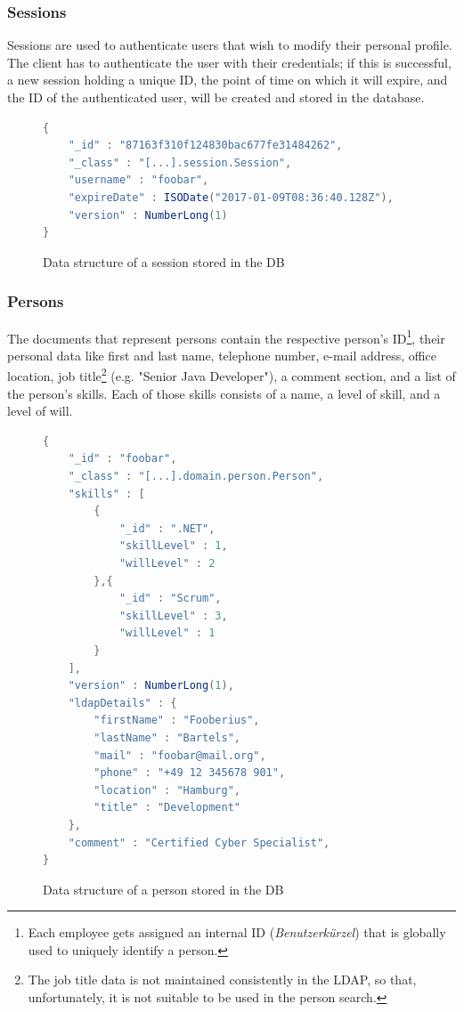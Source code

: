 \subsubsection{Sessions}
Sessions are used to authenticate users that wish to modify their personal profile. The client has to authenticate the user with their credentials; if this is successful, a new session holding a unique ID, the point of time on which it will expire, and the ID of the authenticated user, will be created and stored in the database.

\begin{figure}[h]
\begin{lstlisting}[language=Java]
{
	"_id" : "87163f310f124830bac677fe31484262",
	"_class" : "[...].session.Session",
	"username" : "foobar",
	"expireDate" : ISODate("2017-01-09T08:36:40.128Z"),
	"version" : NumberLong(1)
}
\end{lstlisting}
\caption[Data Structure: Session]{Data structure of a session stored in the DB}
\end{figure}
\subsubsection{Persons}
\label{db:person}
The documents that represent persons contain the respective person's ID\footnote{Each employee gets assigned an internal ID (\textit{Benutzerkürzel}) that is globally used to uniquely identify a person.}, their personal data like first and last name, telephone number, e-mail address, office location, job title\footnote{The job title data is not maintained consistently in the LDAP, so that, unfortunately, it is not suitable to be used in the person search.} (e.g. "Senior Java Developer"), a comment section, and a list of the person's skills. Each of those skills consists of a name, a level of skill, and a level of will.
\begin{figure}[h]
\begin{lstlisting}[language=Java]
{
	"_id" : "foobar",
	"_class" : "[...].domain.person.Person",
	"skills" : [
		{
			"_id" : ".NET",
			"skillLevel" : 1,
			"willLevel" : 2
		},{
			"_id" : "Scrum",
			"skillLevel" : 3,
			"willLevel" : 1
		}
	],
	"version" : NumberLong(1),
	"ldapDetails" : {
		"firstName" : "Fooberius",
		"lastName" : "Bartels",
		"mail" : "foobar@mail.org",
		"phone" : "+49 12 345678 901",
		"location" : "Hamburg",
		"title" : "Development"
	},
	"comment" : "Certified Cyber Specialist",
}
\end{lstlisting}
\caption[Data Structure: Person]{Data structure of a person stored in the DB}
\end{figure}


